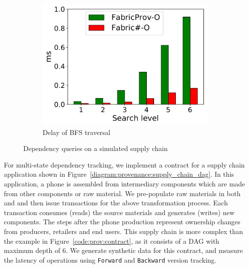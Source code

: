 \begin{figure}[t]
\begin{subfigure}{0.45\textwidth}
      \includegraphics[width=0.99\textwidth]{chart/provenance/bfs.pdf}
      \caption{Delay of BFS traversal}
      \label{chart:provenance:supply_chain_bfs}
    \end{subfigure}
    \caption{Dependency queries on a simulated supply chain}
\end{figure}

For multi-state dependency tracking, we implement a contract for a supply chain
application shown in Figure~\ref{diagram:provenance:supply_chain_dag}.  In this application, a phone is assembled from intermediary
components which are made from other components or raw material. 
We pre-populate raw materials in both {\fsPrO} and {\fsO} and then issue transactions for the above transformation process. 
Each transaction consumes (reads) the source materials and generates (writes) new components. 
The steps after the phone production represent ownership changes from producers, retailers and end users.
This supply chain is more complex than the example in Figure~\ref{code:prov:contract}, as it consists of a DAG with
maximum depth of $6$. We generate synthetic data for this contract, and measure the latency of operations
using  \texttt{Forward} and \texttt{Backward} version tracking.

